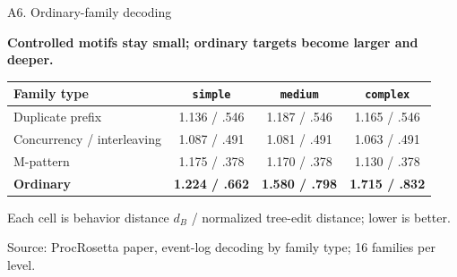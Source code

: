 \documentclass[aspectratio=169,12pt]{beamer}
\newcommand{\source}[1]{\vfill{\tiny\color{prgray}Source: #1\par}}
\newcommand{\keyline}[1]{%
  \begin{center}
  \colorbox{prlightteal}{\parbox{0.91\textwidth}{\centering\bfseries\color{prnavy}#1}}
  \end{center}
}
\begin{document}
\begin{frame}[t]{A6. Ordinary-family decoding}
  \vspace{0mm}
  \keyline{Controlled motifs stay small; ordinary targets become larger and deeper.}
  \vspace{3mm}
  \centering
  \footnotesize
  \renewcommand{\arraystretch}{1.16}
  \setlength{\tabcolsep}{4.5pt}
  \begin{tabular}{@{}lccc@{}}
    \toprule
    Family type & \texttt{simple} & \texttt{medium} & \texttt{complex} \\
    \midrule
    Duplicate prefix & 1.136 / .546 & 1.187 / .546 & 1.165 / .546 \\
    Concurrency / interleaving & 1.087 / .491 & 1.081 / .491 & 1.063 / .491 \\
    M-pattern & 1.175 / .378 & 1.170 / .378 & 1.130 / .378 \\
    \textbf{Ordinary} & \textbf{1.224 / .662} & \textbf{1.580 / .798} & \textbf{1.715 / .832} \\
    \bottomrule
  \end{tabular}
  \par\vspace{4mm}
  \small Each cell is behavior distance $d_B$ / normalized tree-edit distance; lower is better.
  \source{ProcRosetta paper, event-log decoding by family type; 16 families per level.}
\end{frame}
\end{document}
